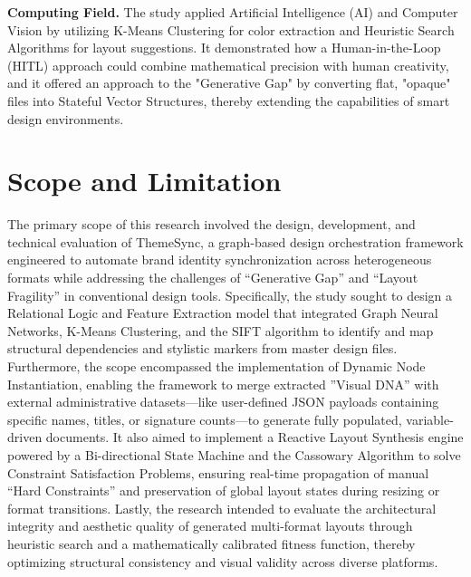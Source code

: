 \begin{refsection}
\textbf{Computing Field.}  The study applied Artificial Intelligence (AI) and Computer Vision by utilizing K-Means Clustering for color extraction and Heuristic Search Algorithms for layout suggestions. It demonstrated how a Human-in-the-Loop (HITL) approach could combine mathematical precision with human creativity, and it offered an approach to the "Generative Gap" by converting flat, "opaque" files into Stateful Vector Structures, thereby extending the capabilities of smart design environments.

\section{Scope and Limitation}

The primary scope of this research involved the design, development, and technical evaluation of ThemeSync, a graph-based design orchestration framework engineered to automate brand identity synchronization across heterogeneous formats while addressing the challenges of “Generative Gap” and “Layout Fragility” in conventional design tools. Specifically, the study sought to design a Relational Logic and Feature Extraction model that integrated Graph Neural Networks, K-Means Clustering, and the SIFT algorithm to identify and map structural dependencies and stylistic markers from master design files. Furthermore, the scope encompassed the implementation of Dynamic Node Instantiation, enabling the framework to merge extracted ”Visual DNA” with external administrative datasets—like user-defined JSON payloads containing specific names, titles, or signature counts—to generate fully populated, variable-driven documents. It also aimed to implement a Reactive Layout Synthesis engine powered by a Bi-directional State Machine and the Cassowary Algorithm to solve Constraint Satisfaction Problems, ensuring real-time propagation of manual “Hard Constraints” and preservation of global layout states during resizing or format transitions. Lastly, the research intended to evaluate the architectural integrity and aesthetic quality of generated multi-format layouts through heuristic search and a mathematically calibrated fitness function, thereby optimizing structural consistency and visual validity across diverse platforms.


\end{refsection}
